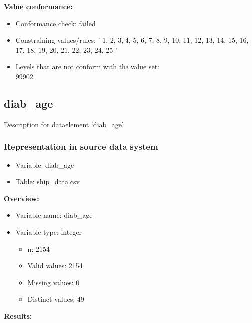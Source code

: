 \documentclass[
]{article}
\providecommand{\tightlist}{%
  \setlength{\itemsep}{0pt}\setlength{\parskip}{0pt}}
\begin{document}
\textbf{Value conformance:}

\begin{itemize}
\tightlist
\item
  Conformance check: failed
\item
  Constraining values/rules: ' 1, 2, 3, 4, 5, 6, 7, 8, 9, 10, 11, 12,
  13, 14, 15, 16, 17, 18, 19, 20, 21, 22, 23, 24, 25 '
\item
  Levels that are not conform with the value set:\\
  99902
\end{itemize}

\newpage

\hypertarget{diab_age}{%
\subsection{diab\_age}\label{diab_age}}

Description for dataelement `diab\_age'

\hypertarget{representation-in-source-data-system-8}{%
\subsubsection{\texorpdfstring{Representation in \textbf{source} data
system}{Representation in source data system}}\label{representation-in-source-data-system-8}}

\begin{itemize}
\tightlist
\item
  Variable: diab\_age
\item
  Table: ship\_data.csv
\end{itemize}

\textbf{Overview:}

\begin{itemize}
\tightlist
\item
  Variable name: diab\_age
\item
  Variable type: integer

  \begin{itemize}
  \tightlist
  \item
    n: 2154
  \item
    Valid values: 2154
  \item
    Missing values: 0
  \item
    Distinct values: 49
  \end{itemize}
\end{itemize}

\textbf{Results:}\\
\end{document}
